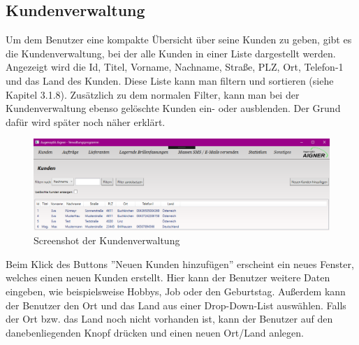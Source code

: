 \subsection{Kundenverwaltung}
Um dem Benutzer eine kompakte Übersicht über seine Kunden zu geben, gibt es die Kundenverwaltung, bei der alle Kunden in einer Liste dargestellt werden. Angezeigt wird die Id, Titel, Vorname, Nachname, Straße, PLZ, Ort, Telefon-1 und das Land des Kunden. Diese Liste kann man filtern und sortieren (siehe Kapitel 3.1.8). Zusätzlich zu dem normalen Filter, kann man bei der Kundenverwaltung ebenso gelöschte Kunden ein- oder ausblenden. Der Grund dafür wird später noch näher erklärt.
\begin{figure}[H]
\begin{center}
	\includegraphics[scale=.45]{images/Kunden.png}
\end{center}
	\caption{Screenshot der Kundenverwaltung}
	\label{fig:sample}
\end{figure}
\noindent Beim Klick des Buttons ''Neuen Kunden hinzufügen'' erscheint ein neues Fenster, welches einen neuen Kunden erstellt. Hier kann der Benutzer weitere Daten eingeben, wie beispielsweise Hobbys, Job oder den Geburtstag. Außerdem kann der Benutzer den Ort und das Land aus einer Drop-Down-List auswählen. Falls der Ort bzw. das Land noch nicht vorhanden ist, kann der Benutzer auf den danebenliegenden Knopf drücken und einen neuen Ort/Land anlegen. 

